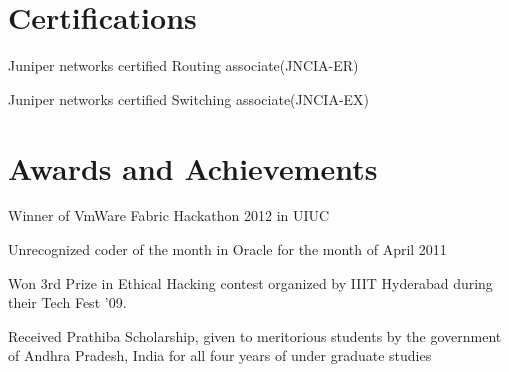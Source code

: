 \documentclass[letterpaper,10pt]{article}
\begin{document}
\section{Certifications}
 \begin{reslist}
  \item {Juniper networks certified Routing associate(JNCIA-ER)}
  \item {Juniper networks certified Switching associate(JNCIA-EX)}
 \end{reslist}
\section{Awards and Achievements}
\begin{reslist}
	\item {Winner of VmWare Fabric Hackathon 2012 in UIUC}
	\item {Unrecognized coder of the month in Oracle for the month of April 2011}
	\item {Won 3rd Prize in Ethical Hacking contest organized by IIIT Hyderabad during their Tech Fest '09.}
	\item {Received Prathiba Scholarship, given to meritorious students by the government of Andhra Pradesh, India for all four years of under graduate studies}
\end{reslist}
\end{document}
